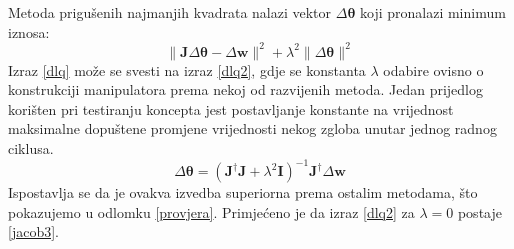 \documentclass[times, utf8, diplomski, numeric]{fer}
\begin{document}
Metoda prigušenih najmanjih kvadrata nalazi vektor $\Delta \bm{\theta}$ koji pronalazi minimum iznosa:
\begin{equation}
\|\mathbf{J}\Delta \bm{\theta} - \Delta \textbf{w}\|^2 + \lambda^2\|\Delta \bm{\theta}\|^2 \label{dlq}
\end{equation}
Izraz \ref{dlq} može se svesti na izraz \ref{dlq2}, gdje se konstanta $\lambda$ odabire ovisno o konstrukciji manipulatora prema nekoj od razvijenih metoda.
Jedan prijedlog korišten pri testiranju koncepta jest postavljanje konstante na vrijednost maksimalne dopuštene promjene vrijednosti nekog zgloba unutar jednog radnog ciklusa.
\begin{equation}
\Delta \bm{\theta} = \left(\mathbf{J}^{\dagger} \mathbf{J} + \lambda^2\mathbf{I}\right)^{-1}\mathbf{J}^{\dagger} \Delta \mathbf{w} \label{dlq2}
\end{equation}
Ispostavlja se da je ovakva izvedba superiorna prema ostalim metodama, što pokazujemo u odlomku \ref{provjera}.
Primjećeno je da izraz \ref{dlq2} za $\lambda = 0$ postaje \ref{jacob3}.
\end{document}

